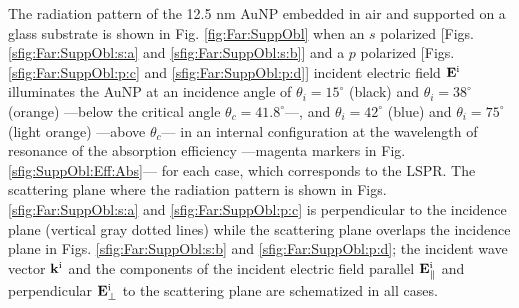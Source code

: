The radiation pattern of the 12.5 nm AuNP embedded in air and supported on a glass substrate is shown in Fig. \ref{fig:Far:SuppObl} when an $s$ polarized [Figs. \ref{sfig:Far:SuppObl:s:a} and \ref{sfig:Far:SuppObl:s:b}] and a  $p$ polarized [Figs. \ref{sfig:Far:SuppObl:p:c} and \ref{sfig:Far:SuppObl:p:d}] incident electric field $\vb{E}^\text{i}$ illuminates the AuNP at an incidence angle of $\theta_i = 15^\circ$ (black) and $\theta_i = 38^\circ$ (orange) ---below the critical angle $\theta_c = 41.8^\circ$---, and $\theta_i = 42^\circ$ (blue) and $\theta_i = 75^\circ$ (light orange) ---above  $\theta_c$--- in an internal configuration at the wavelength of resonance of the absorption efficiency ---magenta markers in Fig. \ref{sfig:SuppObl:Eff:Abs}--- for each case, which corresponds to the LSPR. The scattering plane where the radiation pattern is shown in Figs. \ref{sfig:Far:SuppObl:s:a} and \ref{sfig:Far:SuppObl:p:c}  is perpendicular to the incidence plane (vertical gray dotted lines) while the scattering plane overlaps the incidence plane in Figs. \ref{sfig:Far:SuppObl:s:b} and \ref{sfig:Far:SuppObl:p:d}; the incident wave vector $\vb{k}^\text{i}$ and the components of the incident electric field parallel $\vb{E}^\text{i}_\parallel$ and perpendicular $\vb{E}^\text{i}_\perp$ to the scattering plane are schematized in all cases.

